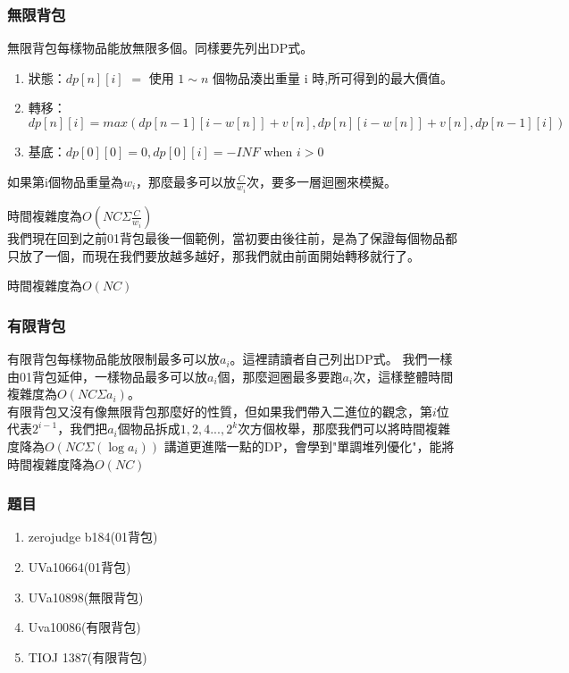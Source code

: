 \subsubsection{無限背包}
無限背包每樣物品能放無限多個。同樣要先列出DP式。
\begin{enumerate}
\item 狀態：$dp[n][i]$ $=$ 使用 $1 ∼ n$ 個物品湊出重量 i 時,所可得到的最大價值。
\item 轉移：$dp[n][i] = max(dp[n − 1][i − w[n]] + v[n], dp[n][i − w[n]] + v[n], dp[n − 1][i])$
\item 基底：$dp[0][0] = 0, dp[0][i] = −INF$ when $i>0$
\end{enumerate}
如果第i個物品重量為$w_i$，那麼最多可以放$\frac{C}{w_i}$次，要多一層迴圈來模擬。

時間複雜度為$O(NC\Sigma\frac{C}{w_i})$\\
我們現在回到之前01背包最後一個範例，當初要由後往前，是為了保證每個物品都只放了一個，而現在我們要放越多越好，那我們就由前面開始轉移就行了。

時間複雜度為$O(NC)$
\subsubsection{有限背包}
有限背包每樣物品能放限制最多可以放$a_i$。這裡請讀者自己列出DP式。
我們一樣由01背包延伸，一樣物品最多可以放$a_i$個，那麼迴圈最多要跑$a_i$次，這樣整體時間複雜度為$O(NC\Sigma a_i)$。\\
有限背包又沒有像無限背包那麼好的性質，但如果我們帶入二進位的觀念，第$i$位代表$2^{i-1}$，我們把$a_i$個物品拆成$1,2,4...,2^k$次方個枚舉，那麼我們可以將時間複雜度降為$O(NC\Sigma(\log a_i))$
講道更進階一點的DP，會學到"單調堆列優化"，能將時間複雜度降為$O(NC)$
\subsubsection{題目}
\begin{enumerate}
\item zerojudge b184(01背包)
\item UVa10664(01背包)
\item UVa10898(無限背包)
\item Uva10086(有限背包)
\item TIOJ 1387(有限背包)
\end{enumerate}
